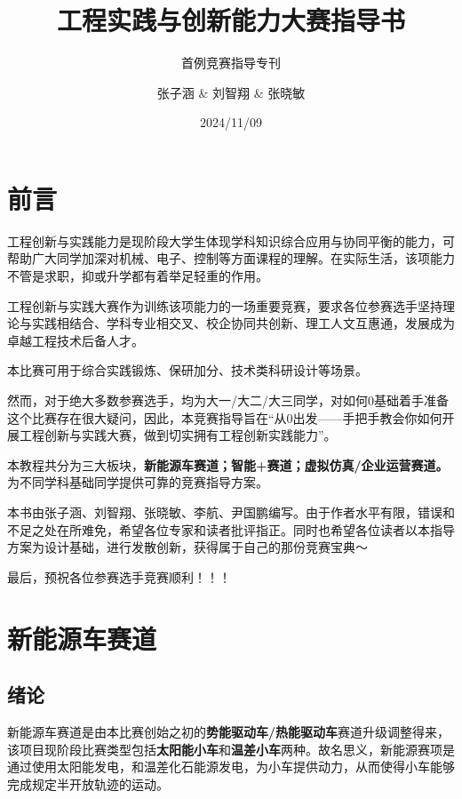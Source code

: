 \documentclass[lang=cn,newtx,14pt,scheme=chinese]{elegantbook}
\title{工程实践与创新能力大赛指导书}
\subtitle{首例竞赛指导专刊}
\author{张子涵 \& 刘智翔 \& 张晓敏 }
\institute{CAUC ETTC}
\date{2024/11/09}
\begin{document}
\maketitle
\frontmatter

\tableofcontents

\mainmatter
\chapter{前言}

工程创新与实践能力是现阶段大学生体现学科知识综合应用与协同平衡的能力，可帮助广大同学加深对机械、电子、控制等方面课程的理解。在实际生活，该项能力不管是求职，抑或升学都有着举足轻重的作用。

工程创新与实践大赛作为训练该项能力的一场重要竞赛，要求各位参赛选手坚持理论与实践相结合、学科专业相交叉、校企协同共创新、理工人文互惠通，发展成为卓越工程技术后备人才。

本比赛可用于综合实践锻炼、保研加分、技术类科研设计等场景。

然而，对于绝大多数参赛选手，均为大一/大二/大三同学，对如何0基础着手准备这个比赛存在很大疑问，因此，本竞赛指导旨在“从0出发——手把手教会你如何开展工程创新与实践大赛，做到切实拥有工程创新实践能力”。

本教程共分为三大板块，\textbf{新能源车赛道；智能+赛道；虚拟仿真/企业运营赛道。}为不同学科基础同学提供可靠的竞赛指导方案。

本书由张子涵、刘智翔、张晓敏、李航、尹国鹏编写。由于作者水平有限，错误和不足之处在所难免，希望各位专家和读者批评指正。同时也希望各位读者以本指导方案为设计基础，进行发散创新，获得属于自己的那份竞赛宝典～

最后，预祝各位参赛选手竞赛顺利！！！

\chapter{新能源车赛道}
\section{绪论}
新能源车赛道是由本比赛创始之初的\textbf{势能驱动车/热能驱动车}赛道升级调整得来，该项目现阶段比赛类型包括\textbf{太阳能小车}和\textbf{温差小车}两种。故名思义，新能源赛项是通过使用太阳能发电，和温差化石能源发电，为小车提供动力，从而使得小车能够完成规定半开放轨迹的运动。
\end{document}
